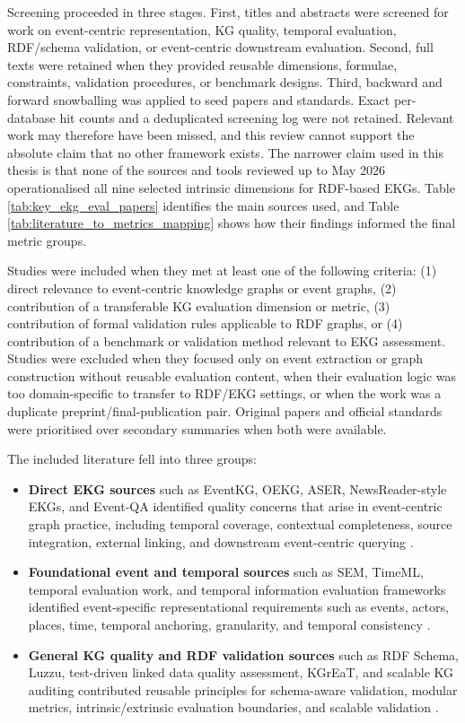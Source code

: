 Screening proceeded in three stages. First, titles and abstracts were screened for work on event-centric representation, KG quality, temporal evaluation, RDF/schema validation, or event-centric downstream evaluation. Second, full texts were retained when they provided reusable dimensions, formulae, constraints, validation procedures, or benchmark designs. Third, backward and forward snowballing was applied to seed papers and standards. Exact per-database hit counts and a deduplicated screening log were not retained. Relevant work may therefore have been missed, and this review cannot support the absolute claim that no other framework exists. The narrower claim used in this thesis is that none of the sources and tools reviewed up to May 2026 operationalised all nine selected intrinsic dimensions for RDF-based EKGs. Table \ref{tab:key_ekg_eval_papers} identifies the main sources used, and Table \ref{tab:literature_to_metrics_mapping} shows how their findings informed the final metric groups.

Studies were included when they met at least one of the following criteria: (1) direct relevance to event-centric knowledge graphs or event graphs, (2) contribution of a transferable KG evaluation dimension or metric, (3) contribution of formal validation rules applicable to RDF graphs, or (4) contribution of a benchmark or validation method relevant to EKG assessment. Studies were excluded when they focused only on event extraction or graph construction without reusable evaluation content, when their evaluation logic was too domain-specific to transfer to RDF/EKG settings, or when the work was a duplicate preprint/final-publication pair. Original papers and official standards were prioritised over secondary summaries when both were available.

The included literature fell into three groups:
\begin{itemize}
    \item \textbf{Direct EKG sources} such as EventKG, OEKG, ASER, NewsReader-style EKGs, and Event-QA identified quality concerns that arise in event-centric graph practice, including temporal coverage, contextual completeness, source integration, external linking, and downstream event-centric querying \citep{eventkg2018,oekg2023,aser2019,newsreader2016,eventqa2020}.
    \item \textbf{Foundational event and temporal sources} such as SEM, TimeML, temporal evaluation work, and temporal information evaluation frameworks identified event-specific representational requirements such as events, actors, places, time, temporal anchoring, granularity, and temporal consistency \citep{sem2011,timeml2003,tempeval2011,tieval2023}.
    \item \textbf{General KG quality and RDF validation sources} such as RDF Schema, Luzzu, test-driven linked data quality assessment, KGrEaT, and scalable KG auditing contributed reusable principles for schema-aware validation, modular metrics, intrinsic/extrinsic evaluation boundaries, and scalable validation \citep{rdfs2014,luzzu2016,testdriven2014,kgreat2023,efficienteval2019}.
\end{itemize}

